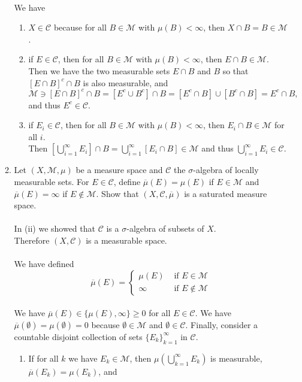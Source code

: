 \begin{enumerate}
\begin{enumerate}[label=(\roman*),align=left]
		\\We have
		\begin{enumerate}[label=(\roman*),align=left]   
			\item $X\in\mathcal{C}$ because for all $B\in\mathcal{M}$ with $\mu(B)<\infty$, then $X\cap B=B\in\mathcal{M}$.
			\item if $E\in\mathcal{C}$, then for all $B\in\mathcal{M}$ with $\mu(B)<\infty$, then $E\cap B\in\mathcal{M}$.\\
			Then we have the two measurable sets $E\cap B$ and $B$ so that $[E\cap B]^c\cap B$ is also measurable, and
			\[
				\mathcal{M}\ni[E\cap B]^c\cap B=[E^c\cup B^c]\cap B=[E^c\cap B]\cup[B^c\cap B]=E^c\cap B,
			\]
			and thus $E^c\in\mathcal{C}$. 
			\item if $E_i\in\mathcal{C}$, then for all $B\in\mathcal{M}$ with $\mu(B)<\infty$, then $E_i\cap B\in\mathcal{M}$ for all $i$.\\
			Then $\left[\bigcup_{i=1}^\infty E_i\right]\cap B=\bigcup_{i=1}^\infty [E_i\cap B]\in\mathcal{M}$ and thus $\bigcup_{i=1}^\infty E_i\in\mathcal{C}$.
		\end{enumerate}
		\item Let $(X,\mathcal{M},\mu)$ be a measure space and $\mathcal{C}$ the $\sigma$-algebra of locally measurable sets.
		For $E\in\mathcal{C}$, define $\overline\mu(E)=\mu(E)$ if $E\in\mathcal{M}$ and $\overline\mu(E)=\infty$ if $E\notin\mathcal{M}$.
		Show that $(X,\mathcal{C},\overline\mu)$ is a saturated measure space.\\
		\\In (ii) we showed that $\mathcal{C}$ is a $\sigma$-algebra of subsets of $X$.\\
		Therefore $(X,\mathcal{C})$ is a measurable space.\\
		\\We have defined
		\[
			\overline\mu(E)=
			\begin{cases}
				\mu(E)&\text{ if }E\in\mathcal{M}\\
				\infty&\text{ if }E\notin\mathcal{M}
			\end{cases}	
		\]
		\\We have $\overline\mu(E)\in\{\mu(E),\infty\}\ge0$ for all $E\in\mathcal{C}$.
		We have $\overline\mu(\emptyset)=\mu(\emptyset)=0$ because $\emptyset\in\mathcal{M}$ and $\emptyset\in\mathcal{C}$.
		Finally, consider a countable disjoint collection of sets $\{E_k\}_{k=1}^\infty$ in $\mathcal{C}$.
		\begin{enumerate}[label=(\roman*),align=left]  
			\item If for all $k$ we have $E_k\in\mathcal{M}$, then $\mu(\bigcup_{k=1}^\infty E_k)$ is measurable, $\overline\mu(E_k)=\mu(E_k)$, and

\end{enumerate}
\end{enumerate}
\end{enumerate}
